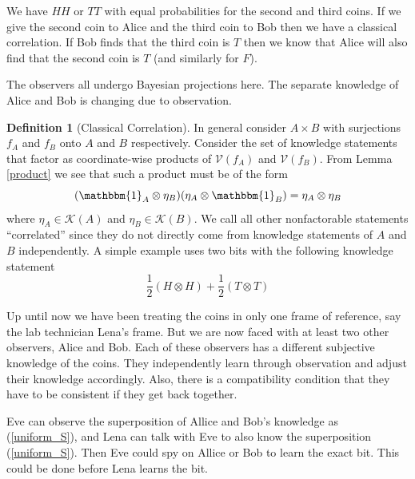 \documentclass[12pt,a4paper]{article}
\theoremstyle{myrule}
\theoremstyle{postulate}
\theoremstyle{definition}
\newtheorem{definition}{Definition}[section]
\begin{document}
We have $HH$ or $TT$ with equal probabilities for the second and third coins.  If we give the second coin to Alice and the third coin to Bob then we have a classical correlation.  If Bob finds that the third coin is $T$ then we know that Alice will also find that the second coin is $T$ (and similarly for $F$).


The observers all undergo Bayesian projections here. The separate knowledge of Alice and Bob is changing due to observation.

\begin{definition}[Classical Correlation]
\label{corrdef}
In general consider $A \times B$ with surjections $f_A$ and $f_B$ onto $A$ and $B$ respectively.  Consider the set of knowledge statements that factor as coordinate-wise products of $\mathcal{V}(f_A)$ and $\mathcal{V}(f_B)$.  From Lemma \ref{product} we see that such a product must be of the form
\[
(\mathbbm{1}_A \otimes \eta_B) (\eta_A \otimes \mathbbm{1}_B) = \eta_A \otimes \eta_B
\]
where $\eta_A \in \mathcal{K}(A)$ and $\eta_B \in \mathcal{K}(B)$.  We call all other nonfactorable statements ``correlated'' since they do not directly come from knowledge statements of $A$ and $B$ independently.  A simple example uses two bits with the following knowledge statement
\begin{equation}
\label{classiccorr}
  \frac{1}{2} (H \otimes H) + \frac{1}{2} (T \otimes T) 
\end{equation}

\end{definition}

Up until now we have been treating the coins in only one frame of reference, say the lab technician Lena's frame.  But we are now faced with at least two other observers, Alice and Bob.  Each of these observers has a different subjective knowledge of the coins.  They independently learn through observation and adjust their knowledge accordingly.  Also, there is a compatibility condition that they have to be consistent if they get back together.

Eve can observe the superposition of Allice and Bob's knowledge as (\ref{uniform_S}), and Lena can talk with Eve to also know the superposition (\ref{uniform_S}).  Then Eve could spy on Allice or Bob to learn the exact bit.  This could be done before Lena learns the bit.
\end{document}
